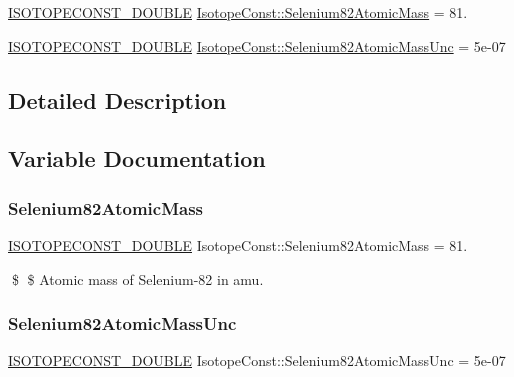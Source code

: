 \begin{DoxyCompactItemize}
\item 
\mbox{\hyperlink{group___isotope_const-_macros_ga8f45a7272ce02c0b4c65c44636ed719a}{I\+S\+O\+T\+O\+P\+E\+C\+O\+N\+S\+T\+\_\+\+D\+O\+U\+B\+LE}} \mbox{\hyperlink{group___isotope_const-_selenium-_se82_ga7f876160df2f243714054402ce2f1814}{Isotope\+Const\+::\+Selenium82\+Atomic\+Mass}} = 81.
\item 
\mbox{\hyperlink{group___isotope_const-_macros_ga8f45a7272ce02c0b4c65c44636ed719a}{I\+S\+O\+T\+O\+P\+E\+C\+O\+N\+S\+T\+\_\+\+D\+O\+U\+B\+LE}} \mbox{\hyperlink{group___isotope_const-_selenium-_se82_gaf89c778b6f3b14caf9fbf765362793e2}{Isotope\+Const\+::\+Selenium82\+Atomic\+Mass\+Unc}} = 5e-\/07
\end{DoxyCompactItemize}


\subsection{Detailed Description}


\subsection{Variable Documentation}
\mbox{\label{group___isotope_const-_selenium-_se82_ga7f876160df2f243714054402ce2f1814}} 
\subsubsection{\texorpdfstring{Selenium82\+Atomic\+Mass}{Selenium82AtomicMass}}
{\footnotesize\ttfamily \mbox{\hyperlink{group___isotope_const-_macros_ga8f45a7272ce02c0b4c65c44636ed719a}{I\+S\+O\+T\+O\+P\+E\+C\+O\+N\+S\+T\+\_\+\+D\+O\+U\+B\+LE}} Isotope\+Const\+::\+Selenium82\+Atomic\+Mass = 81.}

\$ \$ Atomic mass of Selenium-\/82 in amu. \mbox{\label{group___isotope_const-_selenium-_se82_gaf89c778b6f3b14caf9fbf765362793e2}} 
\subsubsection{\texorpdfstring{Selenium82\+Atomic\+Mass\+Unc}{Selenium82AtomicMassUnc}}
{\footnotesize\ttfamily \mbox{\hyperlink{group___isotope_const-_macros_ga8f45a7272ce02c0b4c65c44636ed719a}{I\+S\+O\+T\+O\+P\+E\+C\+O\+N\+S\+T\+\_\+\+D\+O\+U\+B\+LE}} Isotope\+Const\+::\+Selenium82\+Atomic\+Mass\+Unc = 5e-\/07}

